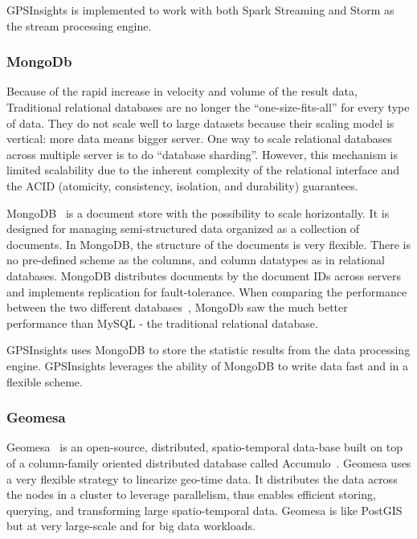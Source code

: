 \documentclass{acm_proc_article-sp}
\begin{document}
GPSInsights is implemented to work with both Spark Streaming and Storm as the stream processing engine.

\subsubsection{MongoDb}


Because of the rapid increase in velocity and volume of the result data, Traditional relational databases are no longer the ``one-size-fits-all'' for every type of data. They do not scale well to large datasets because their scaling model is vertical: more data means bigger server. One way to scale relational databases across multiple server is to do ``database sharding''. However, this mechanism is limited scalability due to the inherent complexity of the relational interface and the ACID (atomicity, consistency, isolation, and durability) guarantees. 

MongoDB~\cite{mongodbweb} is a document store with the possibility to scale horizontally. It is designed for managing semi-structured data organized as a collection of documents. In MongoDB, the structure of the documents is very flexible. There is no pre-defined scheme as the columns, and column datatypes as in relational databases. MongoDB distributes documents by the document IDs across servers and implements replication for fault-tolerance. When comparing the performance between the two different databases~\cite{10.11648/j.ajsea.20150402.12}, MongoDb saw the much better performance than MySQL - the traditional relational database.

GPSInsights uses MongoDB to store the statistic results from the data processing engine. GPSInsights leverages the ability of MongoDB to write data fast and in a flexible scheme. 

\subsubsection{Geomesa}
 
Geomesa~\cite{fox2013spatio} is an open-source, distributed, spatio-temporal data-base built on top of a column-family oriented distributed database called Accumulo~\cite{accumuloonline}. Geomesa uses a very flexible strategy to linearize geo-time data. It distributes the data across the nodes in a cluster to leverage parallelism, thus enables efficient storing, querying, and transforming large spatio-temporal data. Geomesa is like PostGIS~\cite{posgis} but at very large-scale and for big data workloads. 
\end{document}
